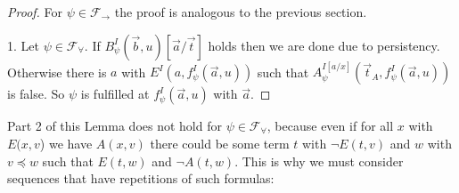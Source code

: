 \documentclass[a4paper,UKenglish,cleveref, autoref, thm-restate]{lipics-v2021}
\begin{document}
\begin{proof}
	For $\psi\in\mathcal F_\to$ the proof is analogous to the previous section.
	
	1. Let $\psi\in\mathcal F_\forall$. If $B^I_\psi(\vec b, u)[\vec a/\vec t]$ holds then we are done due to persistency. Otherwise there is $a$ with $E^I(a, f^I_\psi(\vec a, u))$ such that $A^{I[a/x]}_\psi(\vec t_A, f^I_\psi(\vec a, u))$ is false. So $\psi$ is fulfilled at $f^I_\psi(\vec a, u)$ with $\vec a$.
\end{proof}

Part 2 of this Lemma does not hold for $\psi\in\mathcal F_\forall$, because even if for all $x$ with $E(x, v$) we have $A(x, v)$ there could be some term $t$ with $\neg E(t, v)$ and $w$ with $v\preceq w$ such that $E(t, w)$ and $\neg A(t, w)$. This is why we must consider sequences that have repetitions of such formulas:
\end{document}
